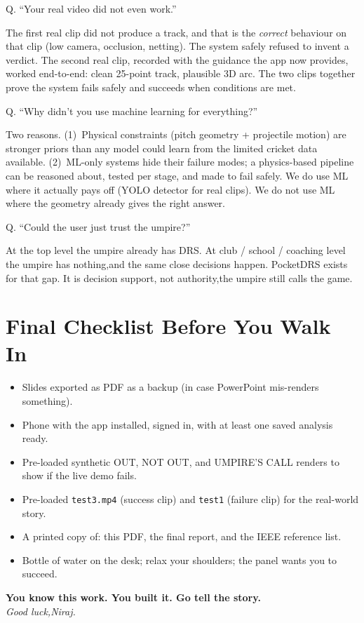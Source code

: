 \documentclass[11pt,a4paper]{article}
\newcommand{\qa}[2]{%
  \par\vspace{8pt}%
  \noindent
  \colorbox{NavyTint}{%
    \begin{minipage}{\dimexpr\textwidth-2\fboxsep\relax}%
      \color{white}\bfseries\strut Q. #1%
    \end{minipage}%
  }\par\nobreak
  \noindent
  \colorbox{MutedBg}{%
    \begin{minipage}{\dimexpr\textwidth-2\fboxsep\relax}%
      \color{black}\setlength{\parskip}{4pt}\strut #2\strut%
    \end{minipage}%
  }%
  \par\vspace{6pt}%
}
\begin{document}
\qa{``Your real video did not even work.''}{%
The first real clip did not produce a track, and that is the \emph{correct} behaviour on that clip (low camera, occlusion, netting). The system safely refused to invent a verdict. The second real clip, recorded with the guidance the app now provides, worked end-to-end: clean 25-point track, plausible 3D arc. The two clips together prove the system fails safely and succeeds when conditions are met.}

\qa{``Why didn't you use machine learning for everything?''}{%
Two reasons. (1)~Physical constraints (pitch geometry + projectile motion) are stronger priors than any model could learn from the limited cricket data available. (2)~ML-only systems hide their failure modes; a physics-based pipeline can be reasoned about, tested per stage, and made to fail safely. We do use ML where it actually pays off (YOLO detector for real clips). We do not use ML where the geometry already gives the right answer.}

\qa{``Could the user just trust the umpire?''}{%
At the top level the umpire already has DRS. At club / school / coaching level the umpire has nothing,and the same close decisions happen. PocketDRS exists for that gap. It is decision support, not authority,the umpire still calls the game.}

\section{Final Checklist Before You Walk In}

\begin{itemize}
  \item Slides exported as PDF as a backup (in case PowerPoint mis-renders something).
  \item Phone with the app installed, signed in, with at least one saved analysis ready.
  \item Pre-loaded synthetic OUT, NOT OUT, and UMPIRE'S CALL renders to show if the live demo fails.
  \item Pre-loaded \texttt{test3.mp4} (success clip) and \texttt{test1} (failure clip) for the real-world story.
  \item A printed copy of: this PDF, the final report, and the IEEE reference list.
  \item Bottle of water on the desk; relax your shoulders; the panel wants you to succeed.
\end{itemize}

\vfill
\begin{center}
\textbf{\color{NavyTint} You know this work. You built it. Go tell the story.}\\[6pt]
\textit{Good luck,Niraj.}
\end{center}
\end{document}
